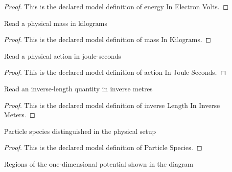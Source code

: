 \begin{proof}
  This is the declared model definition of energy In Electron Volts.
\end{proof}
\begin{definition}
  \label{def:physics:phyx-mini-0533:phyxminiproblems-problemphyxmini0533-massinkilograms}
  Read a physical mass in kilograms
\end{definition}
\begin{proof}
  This is the declared model definition of mass In Kilograms.
\end{proof}
\begin{definition}
  \label{def:physics:phyx-mini-0533:phyxminiproblems-problemphyxmini0533-actioninjouleseconds}
  Read a physical action in joule-seconds
\end{definition}
\begin{proof}
  This is the declared model definition of action In Joule Seconds.
\end{proof}
\begin{definition}
  \label{def:physics:phyx-mini-0533:phyxminiproblems-problemphyxmini0533-inverselengthininversemeters}
  Read an inverse-length quantity in inverse metres
\end{definition}
\begin{proof}
  This is the declared model definition of inverse Length In Inverse Meters.
\end{proof}
\begin{definition}
  \label{def:physics:phyx-mini-0533:phyxminiproblems-problemphyxmini0533-particlespecies}
  Particle species distinguished in the physical setup
\end{definition}
\begin{proof}
  This is the declared model definition of Particle Species.
\end{proof}
\begin{definition}
  \label{def:physics:phyx-mini-0533:phyxminiproblems-problemphyxmini0533-barrierregion}
  Regions of the one-dimensional potential shown in the diagram
\end{definition}
